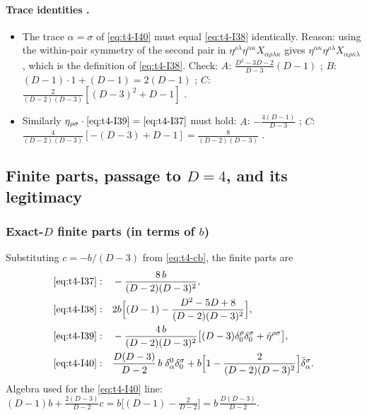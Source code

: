 \paragraph{Trace identities \tC.}
\begin{itemize}
\item The trace \(\alpha=\sigma\) of \eqref{eq:t4-I40} must equal \eqref{eq:t4-I38} identically.
Reason: using the within-pair symmetry of the second pair in
\(\eta^{\rho\lambda}\eta^{\alpha\kappa}X_{\alpha\rho\lambda\kappa}\) gives
\(\eta^{\alpha\kappa}\eta^{\rho\lambda}X_{\alpha\rho\kappa\lambda}\), which is the definition of
\eqref{eq:t4-I38}. Check:
\(A\): \(\tfrac{D^2-3D-2}{D-3}(D-1)\) \chIIok;
\(B\): \((D-1)\cdot1+(D-1)=2(D-1)\) \chIIok;
\(C\): \(\tfrac2{(D-2)(D-3)}[(D-3)^2+D-1]\) \chIIok.
\item Similarly \(\eta_{\rho\sigma}\cdot\eqref{eq:t4-I39}=\eqref{eq:t4-I37}\) must hold:
\(A\): \(-\tfrac{4(D-1)}{D-3}\) \chIIok;
\(C\): \(\tfrac{4}{(D-2)(D-3)}[-(D-3)+D-1]=\tfrac8{(D-2)(D-3)}\) \chIIok.
\end{itemize}

\subsection{Finite parts, passage to \texorpdfstring{$D=4$}{D=4}, and its legitimacy}\label{sec:t4-finite}

\subsubsection{Exact-\texorpdfstring{$D$}{D} finite parts (in terms of \texorpdfstring{$b$}{b}) \texorpdfstring{\tD}{}}
Substituting \(c=-b/(D-3)\) from \eqref{eq:t4-cb}, the finite parts are
\begin{equation}\label{eq:t4-finiteD}
\begin{aligned}
\eqref{eq:t4-I37}:&\quad -\frac{8\,b}{(D-2)(D-3)^2},\\
\eqref{eq:t4-I38}:&\quad 2b\Bigl[(D-1)-\frac{D^2-5D+8}{(D-2)(D-3)^2}\Bigr],\\
\eqref{eq:t4-I39}:&\quad -\frac{4\,b}{(D-2)(D-3)^2}\bigl[(D-3)\delta^\rho_0\delta^\sigma_0+\bar\eta^{\rho\sigma}\bigr],\\
\eqref{eq:t4-I40}:&\quad \frac{D(D-3)}{D-2}\,b\;\delta^0_\alpha\delta^\sigma_0+b\Bigl[1-\frac{2}{(D-2)(D-3)^2}\Bigr]\bar\delta^\sigma_\alpha .
\end{aligned}
\end{equation}
Algebra used for the \eqref{eq:t4-I40} line:
\((D-1)b+\tfrac{2(D-3)}{D-2}c=b\bigl[(D-1)-\tfrac{2}{D-2}\bigr]=b\,\tfrac{D(D-3)}{D-2}\).


